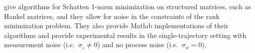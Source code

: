 \cite{fazel2013hankel} give algorithms for Schatten 1-norm minimization
on structured matrices, such as Hankel matrices,
and they allow for noise in the
constraints of the rank minimization problem.
They also provide Matlab implementations of their algorithms
and provide experimental results in the single-trajectory setting
with measurement noise (i.e.\ $\sigma_z \ne 0$)
and no process noise (i.e.\ $\sigma_w = 0$).
